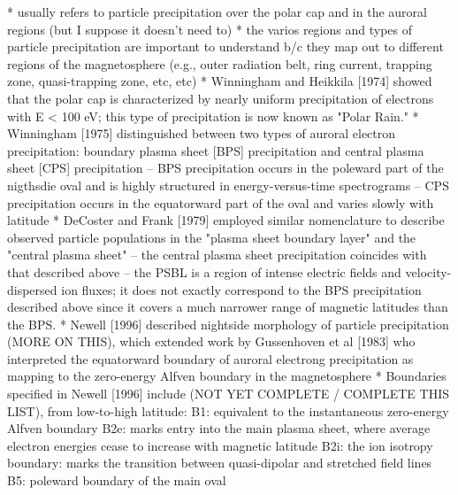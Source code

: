 
* usually refers to particle precipitation over the polar cap and in the
auroral regions (but I suppose it doesn't need to)
* the varios regions and types of particle precipitation are important
to understand b/c they map out to different regions of the magnetosphere
(e.g., outer radiation belt, ring current, trapping zone, quasi-trapping
zone, etc, etc)
* Winningham and Heikkila [1974] showed that the polar cap is
characterized by nearly uniform precipitation of electrons with E < 100
eV; this type of precipitation is now known as "Polar Rain."
* Winningham [1975] distinguished between two types of auroral electron
precipitation: boundary plasma sheet [BPS] precipitation and central
plasma sheet [CPS] precipitation
 -- BPS precipitation occurs in the poleward part of the nigthsdie oval
 and is highly structured in energy-versus-time spectrograms
 -- CPS precipitation occurs in the equatorward part of the oval and
 varies slowly with latitude
* DeCoster and Frank [1979] employed similar nomenclature to describe
observed particle populations in the "plasma sheet boundary layer" and
the "central plasma sheet"
 -- the central plasma sheet precipitation
coincides with that described above
 -- the PSBL is a region of intense electric fields and
 velocity-dispersed ion fluxes; it does not exactly correspond to the BPS 
 precipitation described above since it covers a much narrower range of 
 magnetic latitudes than the BPS.
 * Newell [1996] described nightside morphology of particle
 precipitation (MORE ON THIS), which extended work by Gussenhoven et al
 [1983] who interpreted the equatorward boundary of auroral electrong
 precipitation as mapping to the zero-energy Alfven boundary in the
 magnetosphere
 * Boundaries specified in Newell [1996] include (NOT YET COMPLETE /
 COMPLETE THIS LIST), from low-to-high latitude:
 B1: equivalent to the instantaneous zero-energy Alfven boundary
 B2e: marks entry into the main plasma sheet, where average electron
 energies cease to increase with magnetic latitude
 B2i: the ion isotropy boundary: marks the transition between
 quasi-dipolar and stretched field lines
 B5: poleward boundary of the main oval



